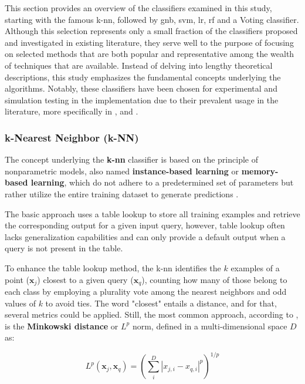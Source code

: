This section provides an overview of the classifiers examined in this study, starting with the famous \gls{k-nn}, followed by \gls{gnb}, \gls{svm}, \gls{lr}, \gls{rf} and a Voting classifier.  Although this selection represents only a small fraction of the classifiers proposed and investigated in existing literature, they serve well to the purpose of focusing on selected methods that are both popular and representative among the wealth of techniques that are available. Instead of delving into lengthy theoretical descriptions, this study emphasizes the fundamental concepts underlying the algorithms. Notably, these classifiers have been chosen for experimental and simulation testing in the implementation due to their prevalent usage in the literature, more specifically in \textcite{Bountourakis2015}, \textcite{Silva2019} and \textcite{Lhoest2021}.


\subsubsection{k-Nearest Neighbor (k-NN)}
\label{subsubsec:machine_learning_k-NN}

The concept underlying the \textbf{\gls{k-nn}} classifier is based on the principle of nonparametric models, also named \textbf{instance-based learning} or \textbf{memory-based learning}, which do not adhere to a predetermined set of parameters but rather utilize the entire training dataset to generate predictions \cite{Russel2010}. 

The basic approach uses a table lookup to store all training examples and retrieve the corresponding output for a given input query, however, table lookup often lacks generalization capabilities and can only provide a default output when a query is not present in the table.

To enhance the table lookup method, the \gls{k-nn} identifies the $k$ examples of a point ($\mathbf{x}_j$) closest to a given query ($\mathbf{x}_q$), counting how many of those belong to each class by employing a plurality vote among the nearest neighbors and odd values of $k$ to avoid ties. The word "closest" entails a distance, and for that, several metrics could be applied. Still, the most common approach, according to \textcite{Russel2010}, is the \textbf{Minkowski distance} or $L^p$ norm, defined in a multi-dimensional space $D$ as:

\begin{equation}
    \label{eq:minkowski_distance}
L^p\left(\mathbf{x}_j, \mathbf{x}_q\right)=\left(\sum_i^D\left|x_{j, i}-x_{q, i}\right|^p\right)^{1 / p}
\end{equation}

